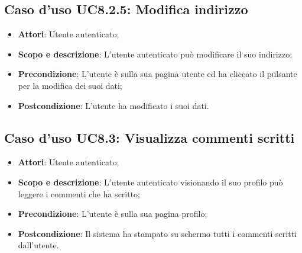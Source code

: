 \documentclass[12pt,a4paper,titlepage]{article}
\begin{document}
	\subsection{Caso d'uso UC8.2.5: Modifica indirizzo}
	\label{UC8.2.5}
	\begin{itemize}
		\item \textbf{Attori}: Utente autenticato;
		\item \textbf{Scopo e descrizione}: L'utente autenticato può modificare il suo indirizzo;
		\item \textbf{Precondizione}: L'utente è sulla sua pagina utente ed ha cliccato il pulsante per la modifica dei suoi dati;
		\item \textbf{Postcondizione}: L'utente ha modificato i suoi dati.
	\end{itemize}
	\subsection{Caso d'uso UC8.3: Visualizza commenti scritti}
	\label{UC8.3}
	\begin{itemize}
		\item \textbf{Attori}: Utente autenticato;
		\item \textbf{Scopo e descrizione}: L'utente autenticato visionando il suo profilo può leggere i commenti che ha scritto;
		\item \textbf{Precondizione}: L'utente è sulla sua pagina profilo;
		\item \textbf{Postcondizione}: Il sistema ha stampato su schermo tutti i commenti scritti dall'utente.
	\end{itemize}
\end{document}
